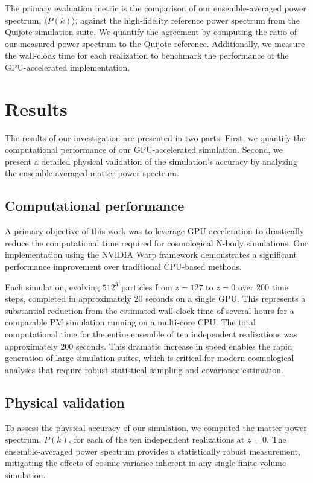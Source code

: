 \documentclass[]{article}
\begin{document}
The primary evaluation metric is the comparison of our ensemble-averaged power spectrum, $\langle P(k) \rangle$, against the high-fidelity reference power spectrum from the Quijote simulation suite. We quantify the agreement by computing the ratio of our measured power spectrum to the Quijote reference. Additionally, we measure the wall-clock time for each realization to benchmark the performance of the GPU-accelerated implementation.

\section{Results}
\label{sec:results}
The results of our investigation are presented in two parts. First, we quantify the computational performance of our GPU-accelerated simulation. Second, we present a detailed physical validation of the simulation's accuracy by analyzing the ensemble-averaged matter power spectrum.

\subsection{Computational performance}
A primary objective of this work was to leverage GPU acceleration to drastically reduce the computational time required for cosmological N-body simulations. Our implementation using the NVIDIA Warp framework demonstrates a significant performance improvement over traditional CPU-based methods.

Each simulation, evolving $512^3$ particles from $z=127$ to $z=0$ over 200 time steps, completed in approximately 20 seconds on a single GPU. This represents a substantial reduction from the estimated wall-clock time of several hours for a comparable PM simulation running on a multi-core CPU. The total computational time for the entire ensemble of ten independent realizations was approximately 200 seconds. This dramatic increase in speed enables the rapid generation of large simulation suites, which is critical for modern cosmological analyses that require robust statistical sampling and covariance estimation.

\subsection{Physical validation}
To assess the physical accuracy of our simulation, we computed the matter power spectrum, $P(k)$, for each of the ten independent realizations at $z=0$. The ensemble-averaged power spectrum provides a statistically robust measurement, mitigating the effects of cosmic variance inherent in any single finite-volume simulation.
\end{document}
